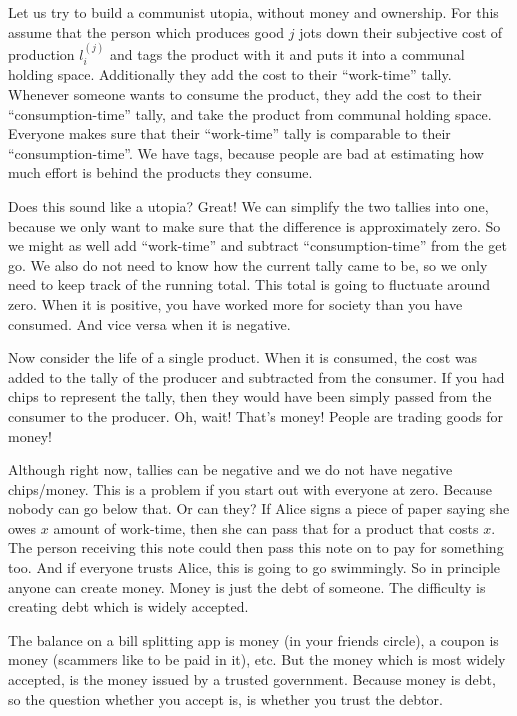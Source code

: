 \begin{example}
	\label{ex: Definitely not Capitalism}
	Let us try to build a communist utopia, without money and ownership.  For
	this assume that the person which produces good \(j\) jots down their
	subjective cost of production \(l_i^{(j)}\) and tags the product with it and
	puts it into a communal holding space. Additionally they add the cost to
	their ``work-time'' tally.  Whenever someone wants to consume the product,
	they add the cost to their ``consumption-time'' tally, and take the product
	from communal holding space.  Everyone makes sure that their ``work-time''
	tally is comparable to their ``consumption-time''. We have tags, because
	people are bad at estimating how much effort is behind the products they
	consume.

	Does this sound like a utopia? Great!
	We can simplify the two tallies into one, because we only want to make
	sure that the difference is approximately zero. So we might as well add
	``work-time'' and subtract ``consumption-time'' from the get go. We also do not
	need to know how the current tally came to be, so we only need to keep track
	of the running total. This total is going to fluctuate around zero. When it
	is positive, you have worked more for society than you have consumed. And
	vice versa when it is negative.

	Now consider the life of a single product. When it is consumed, the cost was
	added to the tally of the producer and subtracted from the consumer. If you
	had chips to represent the tally, then they would have been simply passed from
	the consumer to the producer. Oh, wait! That's money! People are trading goods
	for money!

	Although right now, tallies can be negative and we do not have negative
	chips/money. This is a problem if you start out with everyone at zero. Because
	nobody can go below that. Or can they? If Alice signs a piece of paper saying
	she owes \(x\) amount of work-time, then she can pass that for a product that
	costs \(x\). The person receiving this note could then pass this note on to
	pay for something too. And if everyone trusts Alice, this is going to go
	swimmingly. So in principle anyone can create money. Money is just the debt
	of someone. The difficulty is creating debt which is widely accepted.

	The balance on a bill splitting app is money (in your friends circle), a coupon
	is money (scammers like to be paid in it), etc. But the money which is most
	widely accepted, is the money issued by a trusted government. Because money is
	debt, so the question whether you accept is, is whether you trust the debtor.
\end{example}
